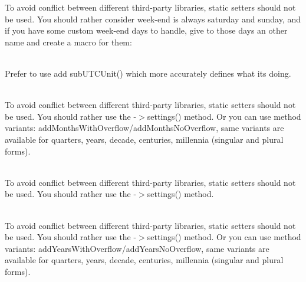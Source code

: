 \begin{DoxyRefList}
To avoid conflict between different third-\/party libraries, static setters should not be used. You should rather consider week-\/end is always saturday and sunday, and if you have some custom week-\/end days to handle, give to those days an other name and create a macro for them\+: 
\item[Global \doxylink{interface_carbon_1_1_carbon_interface_a033f5a93bf79114603e3450bcab3ed62}{Carbon\+Interface\+::sub\+Real\+Unit} (\$unit, \$value=1)]\hfill \\
\label{deprecated__deprecated000203}%
%
Prefer to use add sub\+UTCUnit() which more accurately defines what it\textquotesingle{}s doing. 
\item[Global \doxylink{interface_carbon_1_1_carbon_interface_a04fafb7bdc7085f1e9ae6b47920fbc83}{Carbon\+Interface\+::use\+Months\+Overflow} (bool \$months\+Overflow=true)]\hfill \\
\label{deprecated__deprecated000204}%
%
To avoid conflict between different third-\/party libraries, static setters should not be used. You should rather use the -\/\texorpdfstring{$>$}{>}settings() method. Or you can use method variants\+: add\+Months\+With\+Overflow/add\+Months\+No\+Overflow, same variants are available for quarters, years, decade, centuries, millennia (singular and plural forms).  
\item[Global \doxylink{interface_carbon_1_1_carbon_interface_acf883ab2acec986e7b53894daa5522f8}{Carbon\+Interface\+::use\+Strict\+Mode} (bool \$strict\+Mode\+Enabled=true)]\hfill \\
\label{deprecated__deprecated000205}%
%
To avoid conflict between different third-\/party libraries, static setters should not be used. You should rather use the -\/\texorpdfstring{$>$}{>}settings() method.  
\item[Global \doxylink{interface_carbon_1_1_carbon_interface_a7a242f138246c8574d8ad0afc390939d}{Carbon\+Interface\+::use\+Years\+Overflow} (bool \$years\+Overflow=true)]\hfill \\
\label{deprecated__deprecated000206}%
%
To avoid conflict between different third-\/party libraries, static setters should not be used. You should rather use the -\/\texorpdfstring{$>$}{>}settings() method. Or you can use method variants\+: add\+Years\+With\+Overflow/add\+Years\+No\+Overflow, same variants are available for quarters, years, decade, centuries, millennia (singular and plural forms).  

\end{DoxyRefList}
